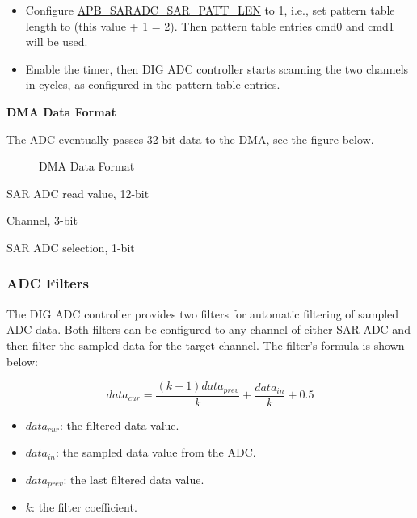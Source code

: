 \documentclass[main\_\_EN.tex]{subfiles}
\begin{document}
\begin{itemize}
    \item Configure \hyperref[fielddesc:APBSARADCSARADCSARPATTLEN]{APB\_SARADC\_SAR\_PATT\_LEN} to 1, i.e., set pattern table length to (this value + 1 = 2). Then pattern table entries cmd0 and cmd1 will be used. 
    \item Enable the timer, then DIG ADC controller starts scanning the two channels in cycles, as configured in the pattern table entries.
\end{itemize}

\textbf{DMA Data Format}

The ADC eventually passes 32-bit data to the DMA, see the figure below.

\begin{figure}[H]
\centering

%
%
%
%
%
\end{figure}
\vspace{-2em}
\begin{figure}[H]
    \centering
    \caption{DMA Data Format}
    \label{fig:sensor-dma-data-format}
\end{figure}
\vspace{-2em}
\begin{regdesc}\begin{reglist}
\item [data] SAR ADC read value, 12-bit
\item [ch\_sel] Channel, 3-bit
\item [sar\_sel] SAR ADC selection, 1-bit
\end{reglist}\end{regdesc}



\subsubsection{ADC Filters}
The DIG ADC controller provides two filters for automatic filtering of sampled ADC data. Both filters can be configured to any channel of either SAR ADC and then filter the sampled data for the target channel. The filter's formula is shown below:

\[data_{cur} = \frac{(k-1)data_{prev}}{k}+\frac{data_{in}}{k}+0.5\]

\begin{itemize}
    \item \(data_{cur}\): the filtered data value.
    \item \(data_{in}\): the sampled data value from the ADC.
    \item \(data_{prev}\): the last filtered data value.
    \item \(k\): the filter coefficient.
\end{itemize}
\end{document}
